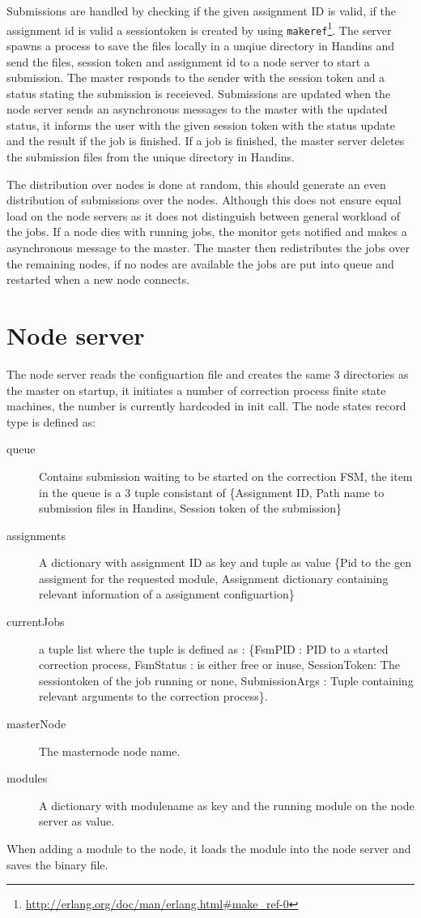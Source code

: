 Submissions are handled by checking if the given assignment ID is valid, if the assignment id is valid a sessiontoken is created by using \texttt{makeref}\footnote{\url{http://erlang.org/doc/man/erlang.html\#make_ref-0}}. The server spawns a process to save the files locally in a unqiue directory in Handins and send the files, session token and assignment id to a node server to start a submission. The master responds to the sender with the session token and a status stating the submission is receieved. Submissions are updated when the node server sends an asynchronous messages to the master with the updated status, it informs the user with the given session token with the status update and the result if the job is finished. If a job is finished, the master server deletes the submission files from the unique directory in Handins.

The distribution over nodes is done at random, this should generate an even distribution of submissions over the nodes. Although this does not ensure equal load on the node servers as it does not distinguish between general workload of the jobs. If a node dies with running jobs, the monitor gets notified and makes a asynchronous message to the master. The master then redistributes the jobs over the remaining nodes, if no nodes are available the jobs are put into queue and restarted when a new node connects.
\section{Node server}
The node server reads the configuartion file and creates the same 3 directories as the master on startup, it initiates a number of correction process finite state machines, the number is currently hardcoded in init call. The node states record type is defined as:
\begin{description}
     \item [queue] Contains submission waiting to be started on the correction FSM, the item in the queue is a 3 tuple consistant of \{Assignment ID, Path name to submission files in Handins, Session token of the submission\}
     \item [assignments] A dictionary with assignment ID as key and tuple as value \{Pid to the gen assigment for the requested module, Assignment dictionary containing relevant information of a assignment configuartion\}
     \item [currentJobs] a tuple list where the tuple is defined as : \{FsmPID : PID to a started correction process, FsmStatus : is either free or inuse, SessionToken: The sessiontoken of the job running or none, SubmissionArgs : Tuple containing relevant arguments to the correction process\}.
     \item [masterNode] The masternode node name.
     \item [modules]  A dictionary with modulename as key and the running module on the node server as value.
 \end{description}
When adding a module to the node, it loads the module into the node server and saves the binary file.

